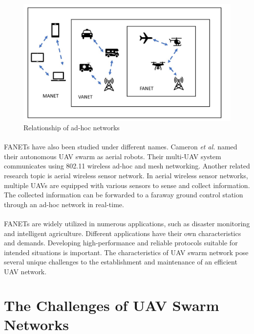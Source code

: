 \documentclass[a4paper,12pt]{report}
\begin{document}
\begin{figure}[h]
\begin{center}
\includegraphics[width=1.05\linewidth]{images/adhoc.jpg}
\caption{Relationship of ad-hoc networks}
\end{center}
\end{figure}

\paragraph{}
FANETs have also been studied under different names\cite{bekmezci2013flying}. Cameron {\it et al.}\cite{cameron2010suaave} named their autonomous UAV swarm as aerial robots. Their multi-UAV system communicates using 802.11 wireless ad-hoc and mesh networking. Another related research topic is aerial wireless sensor network\cite{ahmed2011link,ahmed2016importance, ahmed2013utilizing}. In aerial wireless sensor networks, multiple UAVs are equipped with various sensors to sense and collect information. The collected information can be forwarded to a faraway ground control station through an ad-hoc network in real-time.

\paragraph{}
FANETs are widely utilized in numerous applications, such as disaster monitoring and intelligent agriculture. Different applications have their own characteristics and demands. Developing high-performance and reliable protocols suitable for intended situations is important. The characteristics of UAV swarm network pose several unique challenges to the establishment and maintenance of an efficient UAV network. 

\section{The Challenges of UAV Swarm Networks}
\end{document}
